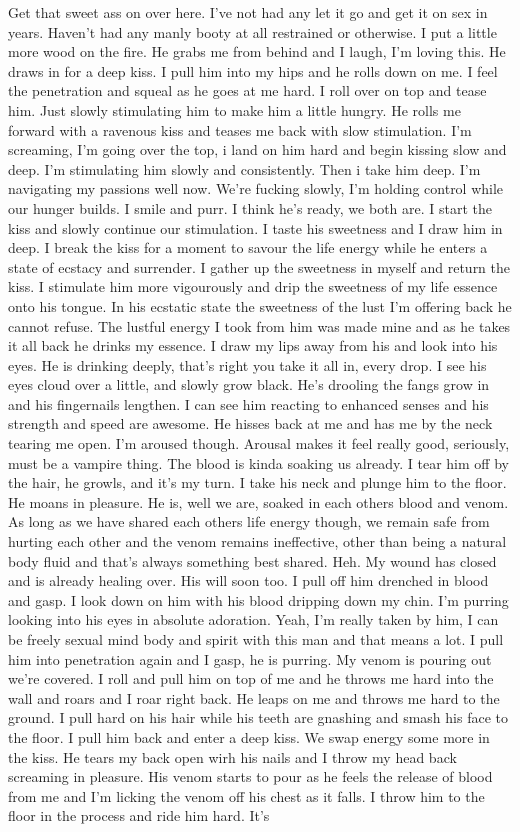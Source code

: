 Get that sweet ass on over here. I've not had any let it go and get it on sex in years. Haven't had any manly booty at all restrained or otherwise. I put a little more wood on the fire. He grabs me from behind and I laugh, I'm loving this. He draws in for a deep kiss. I pull him into my hips and he rolls down on me. I feel the penetration and squeal as he goes at me hard. I roll over on top and tease him. Just slowly stimulating him to make him a little hungry. He rolls me forward with a ravenous kiss and teases me back with slow stimulation. I'm screaming, I'm going over the top, i land on him hard and begin kissing slow and deep. I'm stimulating him slowly and consistently. Then i take him deep. I'm navigating my passions well now. We're fucking slowly, I'm holding control while our hunger builds. I smile and purr. I think he's ready,  we both are. I start the kiss and slowly continue our stimulation. I taste his sweetness and I draw him in deep. I break the kiss for a moment to savour the life energy while he enters a state of ecstacy and surrender. I gather up the sweetness in myself and return the kiss. I stimulate him more vigourously and drip the sweetness of my life essence onto his tongue. In his ecstatic state the sweetness of the lust I'm offering back he cannot refuse. The lustful energy I took from him was made mine and as he takes it all back he drinks my essence. I draw my lips away from his and look into his eyes. He is drinking deeply, that's right you take it all in, every drop. I see his eyes cloud over a little, and slowly grow black. He's drooling the fangs grow in and his fingernails lengthen. I can see him reacting to enhanced senses and his strength and speed are awesome. He hisses back at me and has me by the neck tearing me open. I'm aroused though. Arousal makes it feel really good, seriously, must be a vampire thing. The blood is kinda soaking us already. I tear him off by the hair, he growls, and it's my turn. I take his neck and plunge him to the floor. He moans in pleasure. He is, well we are, soaked in each others blood and venom. As long as we have shared each others life energy though, we remain safe from hurting each other and the venom remains ineffective, other than being a natural body fluid and that's always something best shared. Heh. My wound has closed and is already healing over. His will soon too. I pull off him drenched in blood and gasp. I look down on him with his blood dripping down my chin. I'm purring looking into his eyes in absolute adoration. Yeah, I'm really taken by him, I can be freely sexual mind body and spirit with this man and that means a lot. I pull him into penetration again and I gasp, he is purring. My venom is pouring out we're covered. I roll and pull him on top of me and he throws me hard into the wall and roars and I roar right back. He leaps on me and throws me hard to the ground. I pull hard on his hair while his teeth are gnashing and smash his face to the floor. I pull him back and enter a deep kiss. We swap energy some more in the kiss. He tears my back open wirh his nails and I throw my head back screaming in pleasure. His venom starts to pour as he feels the release of blood from me and I'm licking the venom off his chest as it falls. I throw him to the floor in the process and ride him hard. It's 